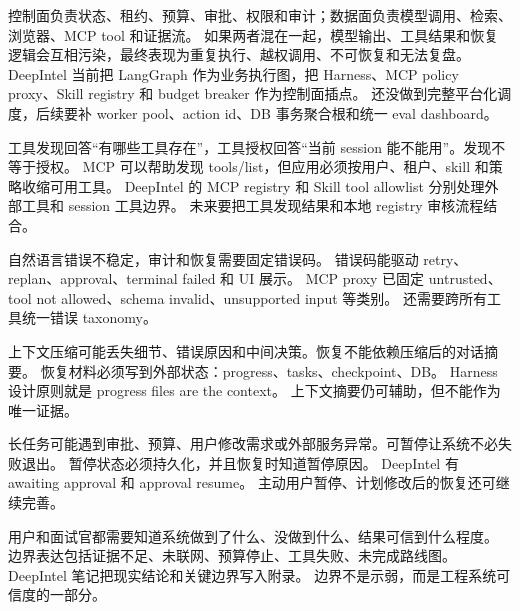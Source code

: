 {控制面负责状态、租约、预算、审批、权限和审计；数据面负责模型调用、检索、浏览器、MCP tool 和证据流。}
{如果两者混在一起，模型输出、工具结果和恢复逻辑会互相污染，最终表现为重复执行、越权调用、不可恢复和无法复盘。}
{DeepIntel 当前把 LangGraph 作为业务执行图，把 Harness、MCP policy proxy、Skill registry 和 budget breaker 作为控制面插点。}
{还没做到完整平台化调度，后续要补 worker pool、action id、DB 事务聚合根和统一 eval dashboard。}

{工具发现回答“有哪些工具存在”，工具授权回答“当前 session 能不能用”。发现不等于授权。}
{MCP 可以帮助发现 tools/list，但应用必须按用户、租户、skill 和策略收缩可用工具。}
{DeepIntel 的 MCP registry 和 Skill tool allowlist 分别处理外部工具和 session 工具边界。}
{未来要把工具发现结果和本地 registry 审核流程结合。}

{自然语言错误不稳定，审计和恢复需要固定错误码。}
{错误码能驱动 retry、replan、approval、terminal failed 和 UI 展示。}
{MCP proxy 已固定 untrusted、tool not allowed、schema invalid、unsupported input 等类别。}
{还需要跨所有工具统一错误 taxonomy。}

{上下文压缩可能丢失细节、错误原因和中间决策。恢复不能依赖压缩后的对话摘要。}
{恢复材料必须写到外部状态：progress、tasks、checkpoint、DB。}
{Harness 设计原则就是 progress files are the context。}
{上下文摘要仍可辅助，但不能作为唯一证据。}

{长任务可能遇到审批、预算、用户修改需求或外部服务异常。可暂停让系统不必失败退出。}
{暂停状态必须持久化，并且恢复时知道暂停原因。}
{DeepIntel 有 awaiting approval 和 approval resume。}
{主动用户暂停、计划修改后的恢复还可继续完善。}

{用户和面试官都需要知道系统做到了什么、没做到什么、结果可信到什么程度。}
{边界表达包括证据不足、未联网、预算停止、工具失败、未完成路线图。}
{DeepIntel 笔记把现实结论和关键边界写入附录。}
{边界不是示弱，而是工程系统可信度的一部分。}
